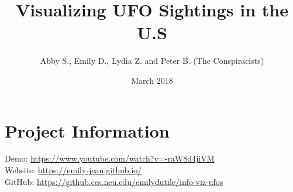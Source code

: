 \documentclass{neu_handout}
\title{Visualizing UFO Sightings in the U.S}
\author{Abby S., Emily D., Lydia Z. and Peter B. (The Conspiracists)}
\date{March 2018}
\begin{document}
\section*{Project Information}

Demo:  \url{https://www.youtube.com/watch?v=-raW8d4jiVM } \\

Website:  \url{https://emily-jean.github.io/ } \\

GitHub: \url{https://github.ccs.neu.edu/emilydutile/info-viz-ufos} \\
 
\end{document}
